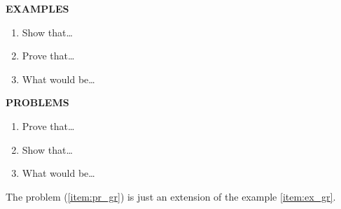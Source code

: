 \documentclass[11pt,a4paper]{article}
\begin{document}
    \begin{center}{\bf EXAMPLES}\end{center}
    \begin{enumerate}[{\bf Ex{a}mple 1:}]
        \item Show that…
        \item Prove that…\label{item:ex_gr}
        \item What would be…
    \end{enumerate}
    \begin{center}{\bf PROBLEMS}\end{center}
    \begin{enumerate}[{\bf Problem (a):}]
        \item Prove that…\label{item:pr_gr}
        \item Show that…
        \item What would be…
    \end{enumerate}
    The problem (\ref{item:pr_gr}) is just an
    extension of the example \ref{item:ex_gr}.
\end{document}
